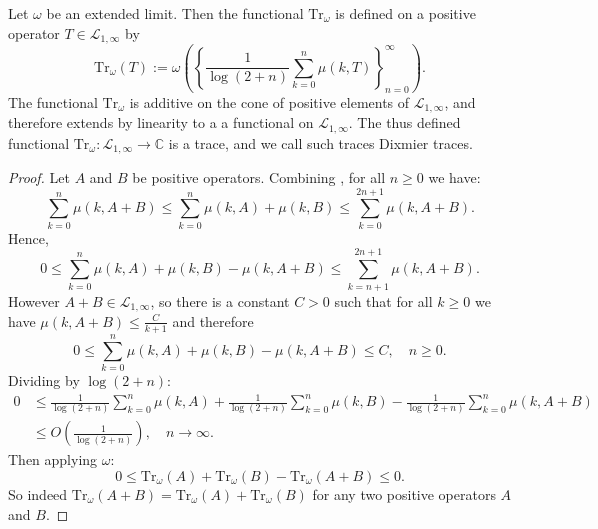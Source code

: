     \begin{ex} 
        Let $\omega$ be an extended limit. Then the functional $\mathrm{Tr}_\omega$ is defined on a positive operator $T \in \mathcal{L}_{1,\infty}$ by
        \begin{equation*}
            \mathrm{Tr}_\omega(T) := \omega\left(\left\{\frac{1}{\log(2+n)}\sum_{k=0}^n \mu(k,T)\right\}_{n=0}^\infty\right).
        \end{equation*}
        The functional $\mathrm{Tr}_\omega$ is additive on the cone of positive elements of $\mathcal{L}_{1,\infty}$, and therefore extends by linearity to a a functional on $\mathcal{L}_{1,\infty}$. The thus defined functional $\mathrm{Tr}_\omega:\mathcal{L}_{1,\infty}\to \mathbb{C}$
        is a trace, and we call such traces Dixmier traces.
    \end{ex}
    \begin{proof}
        Let $A$ and $B$ be positive operators. Combining \cite[Theorem 3.3.3, Theorem 3.3.4]{LSZ}, for all $n \geq 0$ we have:
        \begin{equation*}
            \sum_{k=0}^n \mu(k,A+B) \leq \sum_{k=0}^n \mu(k,A)+\mu(k,B) \leq \sum_{k=0}^{2n+1} \mu(k,A+B).
        \end{equation*}
        Hence,
        \begin{equation*}
            0 \leq \sum_{k=0}^n \mu(k,A)+\mu(k,B)-\mu(k,A+B) \leq \sum_{k=n+1}^{2n+1} \mu(k,A+B).
        \end{equation*}
        However $A+B \in \mathcal{L}_{1,\infty}$, so there is a constant $C > 0$ such that for all $k \geq 0$ we have $\mu(k,A+B) \leq \frac{C}{k+1}$ and therefore
        \begin{equation*}
            0 \leq \sum_{k=0}^n \mu(k,A)+\mu(k,B)-\mu(k,A+B) \leq C,\quad n\geq 0.
        \end{equation*}
        Dividing by $\log(2+n)$:
        \begin{align*}
            0 &\leq \frac{1}{\log(2+n)}\sum_{k=0}^n \mu(k,A) + \frac{1}{\log(2+n)}\sum_{k=0}^n \mu(k,B) - \frac{1}{\log(2+n)}\sum_{k=0}^n \mu(k,A+B)\\
              &\leq O(\frac{1}{\log(2+n)}), \quad n\to\infty.
        \end{align*} 
        Then applying $\omega$:
        \begin{equation*}
            0 \leq \mathrm{Tr}_\omega(A)+\mathrm{Tr}_\omega(B)-\mathrm{Tr}_\omega(A+B) \leq 0.
        \end{equation*}
        So indeed $\mathrm{Tr}_\omega(A+B) = \mathrm{Tr}_\omega(A)+\mathrm{Tr}_\omega(B)$ for any two positive operators $A$ and $B$.
    \end{proof}
    
